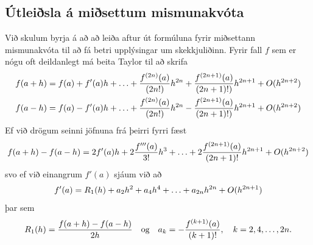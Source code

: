 \documentclass[A4paper,10pt,icelandic]{sphinxmanual}
\begin{document}
\subsection{Útleiðsla á miðsettum mismunakvóta}
\label{kafli04:utleisla-a-misettum-mismunakvota}
Við skulum byrja á að að leiða aftur út formúluna fyrir miðsettann
mismunakvóta til að fá betri upplýsingar um skekkjuliðinn. Fyrir fall
\(f\) sem er nógu oft deildanlegt má beita Taylor til að skrifa
\begin{gather}
\begin{split}\begin{aligned}
  f(a+h) &= f(a) + f'(a)h   + \ldots
  + \frac{f^{(2n)}(a)}{(2n!)}h^{2n}
  + \frac{f^{(2n+1)}(a)}{(2n+1)!)}h^{2n+1} + O(h^{2n+2}) \\
  f(a-h) &= f(a) - f'(a)h
    + \ldots
  + \frac{f^{(2n)}(a)}{(2n!)}h^{2n}
  - \frac{f^{(2n+1)}(a)}{(2n+1)!)}h^{2n+1} + O(h^{2n+2})\end{aligned}\end{split}\notag
\end{gather}
Ef við drögum seinni jöfnuna frá þeirri fyrri fæst
\begin{gather}
\begin{split}f(a+h)-f(a-h) = 2f'(a)h + 2\frac{f'''(a)}{3!}h^3
  + \ldots + 2\frac{f^{(2n+1)}(a)}{(2n+1)!}h^{2n+1} + O(h^{2n+2})\end{split}\notag
\end{gather}
svo ef við einangrum \(f'(a)\) sjáum við að
\begin{gather}
\begin{split}f'(a) = R_1(h)
  + a_2 h^2 + a_4 h^4 + \ldots + a_{2n} h^{2n} + O(h^{2n+1})\end{split}\notag
\end{gather}
þar sem
\begin{gather}
\begin{split}R_1(h) = \frac{f(a+h)-f(a-h)}{2h}
  \quad \text{og} \quad
  a_k = -\frac{f^{(k+1)}(a)}{(k+1)!},
  \quad k = 2,4,\ldots,2n.\end{split}\notag
\end{gather}
\end{document}
